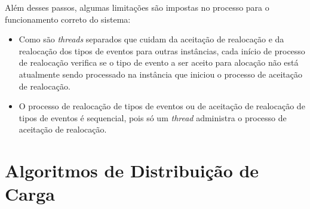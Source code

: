 Além desses passos, algumas limitações são impostas no processo para o funcionamento correto do sistema:
\begin{itemize}

\item Como são \textit{threads} separados que cuidam da aceitação de realocação e da realocação dos tipos de eventos para outras instâncias,  cada início de processo de realocação verifica se o tipo de evento a ser aceito para alocação não está atualmente sendo processado na instância que iniciou o processo de aceitação de realocação.

\item O processo de realocação de tipos de eventos ou de aceitação de realocação de tipos de eventos é sequencial, pois só um \textit{thread} administra o processo de aceitação de realocação.


\end{itemize}


\section{Algoritmos de Distribuição de Carga}
\label{sec:loadDistribution}

